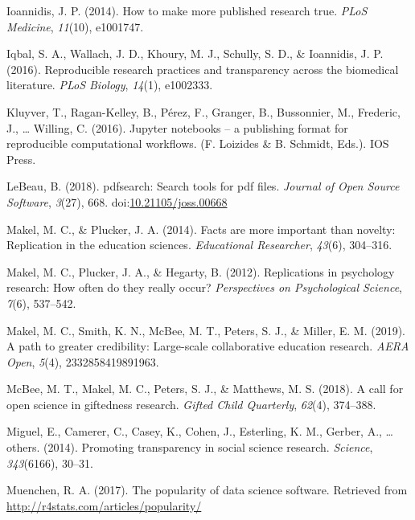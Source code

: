 \documentclass[
  english,
  ,man]{apa6}
\newlength{\cslhangindent}
\newenvironment{cslreferences}%
  {\setlength{\parindent}{0pt}%
  \everypar{\setlength{\hangindent}{\cslhangindent}}\ignorespaces}%
  {\par}
\begin{document}
\begin{cslreferences}
\leavevmode\hypertarget{ref-ioannidis2014}{}%
Ioannidis, J. P. (2014). How to make more published research true. \emph{PLoS Medicine}, \emph{11}(10), e1001747.

\leavevmode\hypertarget{ref-iqbal2016}{}%
Iqbal, S. A., Wallach, J. D., Khoury, M. J., Schully, S. D., \& Ioannidis, J. P. (2016). Reproducible research practices and transparency across the biomedical literature. \emph{PLoS Biology}, \emph{14}(1), e1002333.

\leavevmode\hypertarget{ref-kluyver2016}{}%
Kluyver, T., Ragan-Kelley, B., Pérez, F., Granger, B., Bussonnier, M., Frederic, J., \ldots{} Willing, C. (2016). Jupyter notebooks -- a publishing format for reproducible computational workflows. (F. Loizides \& B. Schmidt, Eds.). IOS Press.

\leavevmode\hypertarget{ref-pdfsearch}{}%
LeBeau, B. (2018). pdfsearch: Search tools for pdf files. \emph{Journal of Open Source Software}, \emph{3}(27), 668. doi:\href{https://doi.org/10.21105/joss.00668}{10.21105/joss.00668}

\leavevmode\hypertarget{ref-makel2014}{}%
Makel, M. C., \& Plucker, J. A. (2014). Facts are more important than novelty: Replication in the education sciences. \emph{Educational Researcher}, \emph{43}(6), 304--316.

\leavevmode\hypertarget{ref-makel2012}{}%
Makel, M. C., Plucker, J. A., \& Hegarty, B. (2012). Replications in psychology research: How often do they really occur? \emph{Perspectives on Psychological Science}, \emph{7}(6), 537--542.

\leavevmode\hypertarget{ref-makel2019path}{}%
Makel, M. C., Smith, K. N., McBee, M. T., Peters, S. J., \& Miller, E. M. (2019). A path to greater credibility: Large-scale collaborative education research. \emph{AERA Open}, \emph{5}(4), 2332858419891963.

\leavevmode\hypertarget{ref-mcbee2018call}{}%
McBee, M. T., Makel, M. C., Peters, S. J., \& Matthews, M. S. (2018). A call for open science in giftedness research. \emph{Gifted Child Quarterly}, \emph{62}(4), 374--388.

\leavevmode\hypertarget{ref-miguel2014}{}%
Miguel, E., Camerer, C., Casey, K., Cohen, J., Esterling, K. M., Gerber, A., \ldots{} others. (2014). Promoting transparency in social science research. \emph{Science}, \emph{343}(6166), 30--31.

\leavevmode\hypertarget{ref-muenchen}{}%
Muenchen, R. A. (2017). The popularity of data science software. Retrieved from \url{http://r4stats.com/articles/popularity/}


\end{cslreferences}
\end{document}
